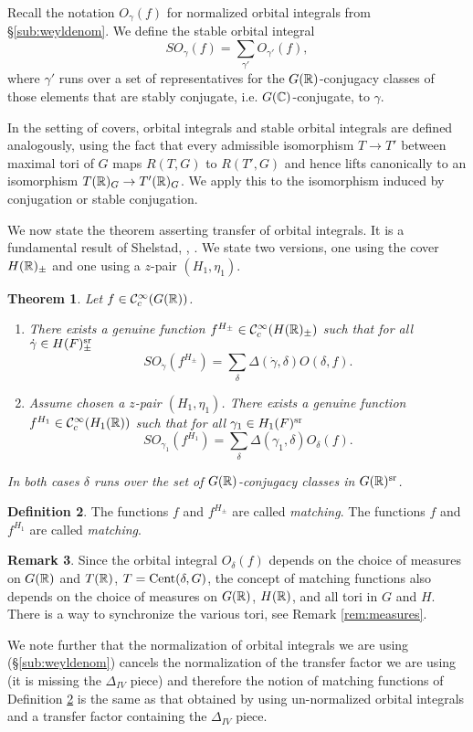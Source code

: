 \documentclass{article}
\newtheorem{thm}{Theorem}[subsection]
\theoremstyle{definition}
\newtheorem{dfn}[thm]{Definition}
\newtheorem{rem}[thm]{Remark}
\numberwithin{equation}{section}
\renewcommand{\-}{\hyp{}}
\begin{document}
Recall the notation $O_\gamma(f)$ for normalized orbital integrals from \S\ref{sub:weyldenom}. We define the stable orbital integral
\[ SO_\gamma(f) = \sum_{\gamma'} O_{\gamma'}(f), \]
where $\gamma'$ runs over a set of representatives for the $G(\mathbb{R})$-conjugacy classes of those elements that are stably conjugate, i.e. $G(\mathbb{C})$-conjugate, to $\gamma$.

In the setting of covers, orbital integrals and stable orbital integrals are defined analogously, using the fact that every admissible isomorphism $T \to T'$ between maximal tori of $G$ maps $R(T,G)$ to $R(T',G)$ and hence lifts canonically to an isomorphism $T(\mathbb{R})_G \to T'(\mathbb{R})_G$. We apply this to the isomorphism induced by conjugation or stable conjugation. 

We now state the theorem asserting transfer of orbital integrals. It is a fundamental result of Shelstad, \cite{She82}, \cite{SheTE1}. We state two versions, one using the cover $H(\mathbb{R})_\pm$ and one using a $z$-pair $(H_1,\eta_1)$. 

\begin{thm} \label{thm:orbtrans}
Let $f \in \mathcal{C}_c^\infty(G(\mathbb{R}))$.
\begin{enumerate}
	\item There exists a genuine function $f^{H_\pm} \in \mathcal{C}_c^\infty(H(\mathbb{R})_\pm)$ such that for all $\dot\gamma \in H(F)_\pm^{\textrm{sr}}$
	\[ SO_{\dot\gamma}(f^{H_\pm}) = \sum_\delta \Delta(\dot\gamma,\delta) O(\delta,f). \]
	\item Assume chosen a $z$-pair $(H_1,\eta_1)$. There exists a genuine function $f^{H_1} \in \mathcal{C}_c^\infty(H_1(\mathbb{R}))$ such that for all $\gamma_1 \in H_1(F)^{\textrm{sr}}$
	\[ SO_{\gamma_1}(f^{H_1}) = \sum_\delta \Delta(\gamma_1,\delta) O_\delta(f). \]
\end{enumerate}
In both cases $\delta$ runs over the set of $G(\mathbb{R})$-conjugacy classes in $G(\mathbb{R})^{\textrm{sr}}$.
\end{thm}

\begin{dfn} \label{dfn:matching}
The functions $f$ and $f^{H_\pm}$ are called \emph{matching}. The functions $f$ and $f^{H_1}$ are called \emph{matching}.
\end{dfn}

\begin{rem} \label{rem:matchmeasures}
	Since the orbital integral $O_\delta(f)$ depends on the choice of measures on $G(\mathbb{R})$ and $T(\mathbb{R})$, $T=\textrm{Cent}(\delta,G)$, the concept of matching functions also depends on the choice of measures on $G(\mathbb{R})$, $H(\mathbb{R})$, and all tori in $G$ and $H$. There is a way to synchronize the various tori, see Remark \ref{rem:measures}.

	We note further that the normalization of orbital integrals we are using (\S\ref{sub:weyldenom}) cancels the normalization of the transfer factor we are using (it is missing the $\Delta_{IV}$ piece) and therefore the notion of matching functions of Definition \ref{dfn:matching} is the same as that obtained by using un-normalized orbital integrals and a transfer factor containing the $\Delta_{IV}$ piece.
\end{rem}
\end{document}
